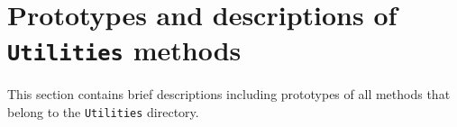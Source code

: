 \par
\section{Prototypes and descriptions of {\tt Utilities} methods}
\label{section:Utilities:proto}
\par
This section contains brief descriptions including prototypes
of all methods that belong to the {\tt Utilities} directory.
\par
%
%
% 
% 
% 
% 
% 
% 
% 
% 
% 
% 
% 
% 
%
%












